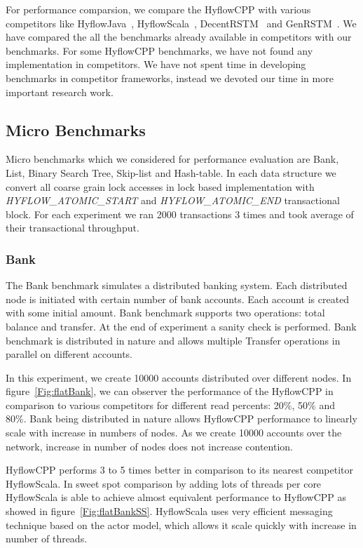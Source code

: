 \documentclass[12pt,english]{report}
\begin{document}
For performance comparsion, we compare the HyflowCPP with various competitors like HyflowJava~\cite{Saad:2011:HHP:1996130.1996167}, HyflowScala~\cite{turcuhyflow2}, DecentRSTM~\cite{DecentSTM:5470446} and GenRSTM~\cite{GenRSTM:6038614}. We have compared the all the benchmarks already available in competitors with our benchmarks. For some HyflowCPP benchmarks, we have not found any implementation in competitors. We have not spent time in developing benchmarks in competitor frameworks, instead we devoted our time in more important research work. 

\subsection{Micro Benchmarks}

Micro benchmarks which we considered for performance evaluation are Bank, List, Binary Search Tree, Skip-list and Hash-table. In each data structure we convert all coarse grain lock accesses in lock based implementation with \emph{HYFLOW{\_}ATOMIC{\_}START} and \emph{HYFLOW{\_}ATOMIC{\_}END} transactional block. For each experiment we ran 2000 transactions 3 times and took average of their transactional throughput.  

\subsubsection{Bank}

The Bank benchmark simulates a distributed banking system. Each distributed node is initiated with certain number of bank accounts. Each account is created with some initial amount. Bank benchmark supports two operations: total balance and transfer. At the end of experiment a sanity check is performed. Bank benchmark is distributed in nature and allows multiple Transfer operations in parallel on different accounts.

In this experiment, we create 10000 accounts distributed over different nodes. In figure~\ref{Fig:flatBank}, we can observer the performance of the HyflowCPP in comparison to various competitors for different read percents: 20\%, 50\% and 80\%. Bank being distributed in nature allows HyflowCPP performance to linearly scale with increase in numbers of nodes. As we create 10000 accounts over the network, increase in number of nodes does not increase contention.

HyflowCPP performs 3 to 5 times better in comparison to its nearest competitor HyflowScala. In sweet spot comparison by adding lots of threads per core HyflowScala is able to achieve almost equivalent performance to HyflowCPP as showed in figure~\ref{Fig:flatBankSS}. HyflowScala uses very efficient messaging technique based on the actor model, which allows it scale quickly with increase in number of threads.
\end{document}
